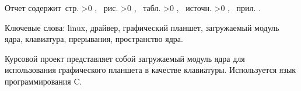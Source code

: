 \Referat

    Отчет содержит \pageref{LastPage}\,стр.%
    \ifnum \totfig >0
    , \totfig~рис.%
    \fi
    \ifnum \tottab >0
    , \tottab~табл.%
    \fi
    \ifnum \totbib >0
    , \totbib~источн.%
    \fi
    \ifnum \totapp >0
    , \totapp~прил.%
    \else
    .%
    \fi

    Ключевые слова: linux, драйвер, графический планшет, загружаемый модуль ядра, клавиатура, прерывания, пространство ядра.

    Курсовой проект представляет собой загружаемый модуль ядра для использования графического планшета в качестве клавиатуры. Используется язык программирования C.


